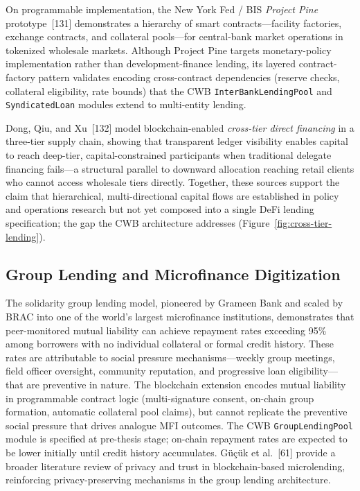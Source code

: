 \documentclass[12pt,a4paper]{report}
\begin{document}
On programmable implementation, the New York Fed / BIS \textit{Project Pine} prototype~[131] demonstrates a hierarchy of smart contracts---facility factories, exchange contracts, and collateral pools---for central-bank market operations in tokenized wholesale markets. Although Project Pine targets monetary-policy implementation rather than development-finance lending, its layered contract-factory pattern validates encoding cross-contract dependencies (reserve checks, collateral eligibility, rate bounds) that the CWB \texttt{InterBankLendingPool} and \texttt{SyndicatedLoan} modules extend to multi-entity lending.

Dong, Qiu, and Xu~[132] model blockchain-enabled \emph{cross-tier direct financing} in a three-tier supply chain, showing that transparent ledger visibility enables capital to reach deep-tier, capital-constrained participants when traditional delegate financing fails---a structural parallel to downward allocation reaching retail clients who cannot access wholesale tiers directly. Together, these sources support the claim that hierarchical, multi-directional capital flows are established in policy and operations research but not yet composed into a single DeFi lending specification; the gap the CWB architecture addresses (Figure~\ref{fig:cross-tier-lending}).

\subsection{Group Lending and Microfinance Digitization}

The solidarity group lending model, pioneered by Grameen Bank and scaled by BRAC into one of the world's largest microfinance institutions, demonstrates that peer-monitored mutual liability can achieve repayment rates exceeding 95\% among borrowers with no individual collateral or formal credit history. These rates are attributable to social pressure mechanisms---weekly group meetings, field officer oversight, community reputation, and progressive loan eligibility---that are preventive in nature. The blockchain extension encodes mutual liability in programmable contract logic (multi-signature consent, on-chain group formation, automatic collateral pool claims), but cannot replicate the preventive social pressure that drives analogue MFI outcomes. The CWB \texttt{GroupLendingPool} module is specified at pre-thesis stage; on-chain repayment rates are expected to be lower initially until credit history accumulates. Güçük et al.~[61] provide a broader literature review of privacy and trust in blockchain-based microlending, reinforcing privacy-preserving mechanisms in the group lending architecture.
\end{document}
